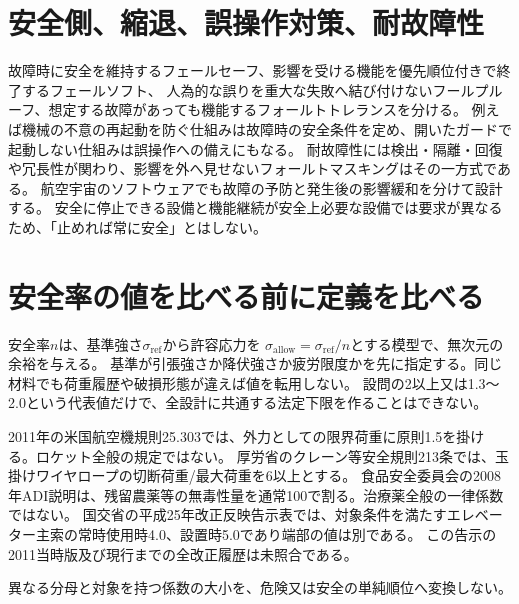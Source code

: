 \section{安全側、縮退、誤操作対策、耐故障性}
\label{theory:dependability:handling}
故障時に安全を維持するフェールセーフ、影響を受ける機能を優先順位付きで終了するフェールソフト、
人為的な誤りを重大な失敗へ結び付けないフールプルーフ、想定する故障があっても機能するフォールトトレランスを分ける。
例えば機械の不意の再起動を防ぐ仕組みは故障時の安全条件を定め、開いたガードで起動しない仕組みは誤操作への備えにもなる。\cite{design_mhlw_failsafe,design_mhlw_foolproof}
耐故障性には検出・隔離・回復や冗長性が関わり、影響を外へ見せないフォールトマスキングはその一方式である。
航空宇宙のソフトウェアでも故障の予防と発生後の影響緩和を分けて設計する。\cite{design_nasa_tolerance}
安全に停止できる設備と機能継続が安全上必要な設備では要求が異なるため、「止めれば常に安全」とはしない。

\section{安全率の値を比べる前に定義を比べる}
\label{theory:dependability:factor}
安全率\(n\)は、基準強さ\(\sigma_{\mathrm{ref}}\)から許容応力を
\(\sigma_{\mathrm{allow}}=\sigma_{\mathrm{ref}}/n\)とする模型で、無次元の余裕を与える。
基準が引張強さか降伏強さか疲労限度かを先に指定する。同じ材料でも荷重履歴や破損形態が違えば値を転用しない。
設問の2以上又は1.3～2.0という代表値だけで、全設計に共通する法定下限を作ることはできない。
\begin{tcolorbox}[title=対象と資料時点を限定した例]
2011年の米国航空機規則25.303では、外力としての限界荷重に原則1.5を掛ける。ロケット全般の規定ではない。
厚労省のクレーン等安全規則213条では、玉掛けワイヤロープの切断荷重/最大荷重を6以上とする。
食品安全委員会の2008年ADI説明は、残留農薬等の無毒性量を通常100で割る。治療薬全般の一律係数ではない。
国交省の平成25年改正反映告示表では、対象条件を満たすエレベーター主索の常時使用時4.0、設置時5.0であり端部の値は別である。
この告示の2011当時版及び現行までの全改正履歴は未照合である。
\end{tcolorbox}
\cite{design_faa_2011,design_mhlw_crane,design_fsc_adi,design_mlit_elevator}
異なる分母と対象を持つ係数の大小を、危険又は安全の単純順位へ変換しない。

